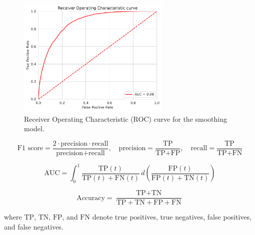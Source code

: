 \begin{figure}[htpb]
    \centering
    \includegraphics[width=0.65\textwidth]{img/smoothing-roc.pdf}
    \caption{Receiver Operating Characteristic (ROC) curve for the smoothing model.}
    \label{fig:smoothing-roc}
\end{figure}

\begin{equation}
\text{F1 score} = \frac{2 \cdot \text{precision} \cdot \text{recall}}{\text{precision} + \text{recall}}, \quad
\text{precision} = \frac{\text{TP}}{\text{TP} + \text{FP}}, \quad
\text{recall} = \frac{\text{TP}}{\text{TP} + \text{FN}}
\label{eq:f1-score}
\end{equation}

\begin{equation}
\text{AUC} = \int_0^1 \frac{\text{TP}(t)}{\text{TP}(t) + \text{FN}(t)} \, d\left( \frac{\text{FP}(t)}{\text{FP}(t) + \text{TN}(t)} \right)
\label{eq:auc}
\end{equation}

\begin{equation}
\text{Accuracy} = \frac{\text{TP} + \text{TN}}{\text{TP} + \text{TN} + \text{FP} + \text{FN}}
\label{eq:accuracy}
\end{equation}

where $\text{TP}$, $\text{TN}$, $\text{FP}$, and $\text{FN}$ denote true positives, true negatives, false positives, and false negatives.

